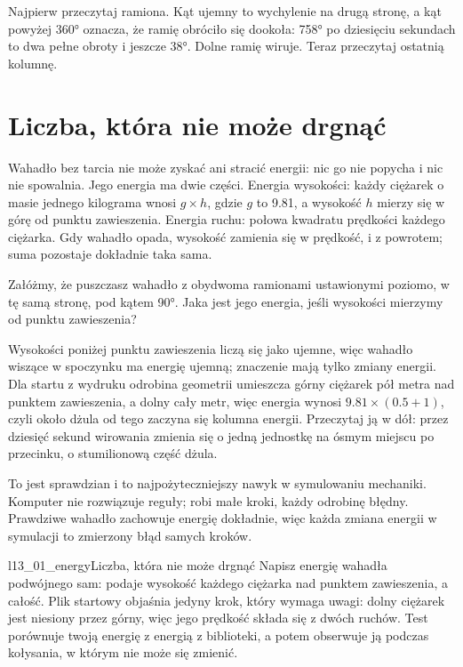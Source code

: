 \noindent
Najpierw przeczytaj ramiona. Kąt ujemny to wychylenie na drugą stronę, a kąt
powyżej 360° oznacza, że ramię obróciło się dookoła: 758° po dziesięciu
sekundach to dwa pełne obroty i jeszcze 38°. Dolne ramię wiruje. Teraz
przeczytaj ostatnią kolumnę.

\section{Liczba, która nie może drgnąć}
\label{sec:ch13-energy}

\noindent
Wahadło bez tarcia nie może zyskać ani stracić energii: nic go nie popycha i
nic nie spowalnia. Jego energia ma dwie części. Energia wysokości: każdy
ciężarek o masie jednego kilograma wnosi $g \times h$, gdzie $g$ to
\num{9.81}, a wysokość $h$ mierzy się w górę od punktu zawieszenia. Energia
ruchu: połowa kwadratu prędkości każdego ciężarka. Gdy wahadło opada,
wysokość zamienia się w prędkość, i z powrotem; suma pozostaje dokładnie taka
sama.

\begin{think}
Załóżmy, że puszczasz wahadło z obydwoma ramionami ustawionymi poziomo, w tę
samą stronę, pod kątem 90°. Jaka jest jego energia, jeśli wysokości mierzymy
od punktu zawieszenia?
\end{think}
Wysokości poniżej punktu zawieszenia liczą się jako ujemne, więc wahadło
wiszące w spoczynku ma energię ujemną; znaczenie mają tylko zmiany energii.
Dla startu z wydruku odrobina geometrii umieszcza górny ciężarek pół
metra nad punktem zawieszenia, a dolny cały metr, więc energia wynosi
$\num{9.81} \times (\num{0.5} + 1)$, czyli około 
dżula \dash{} od tego zaczyna się kolumna energii. Przeczytaj ją w dół: przez
dziesięć sekund wirowania zmienia się o jedną jednostkę na ósmym miejscu po
przecinku, o stumilionową część dżula.

To jest sprawdzian i to najpożyteczniejszy nawyk w symulowaniu mechaniki.
Komputer nie rozwiązuje reguły; robi małe kroki, każdy odrobinę błędny.
Prawdziwe wahadło zachowuje energię dokładnie, więc każda zmiana energii w
symulacji to zmierzony błąd samych kroków.

\begin{lab}{l13_01_energy}{Liczba, która nie może drgnąć}
Napisz energię wahadła podwójnego sam:  podaje wysokość każdego
ciężarka nad punktem zawieszenia, a  \dash{} całość. Plik
startowy objaśnia jedyny krok, który wymaga uwagi: dolny ciężarek jest
niesiony przez górny, więc jego prędkość składa się z dwóch ruchów. Test
porównuje twoją energię z energią z biblioteki, a potem obserwuje ją podczas
kołysania, w którym nie może się zmienić.
\end{lab}

